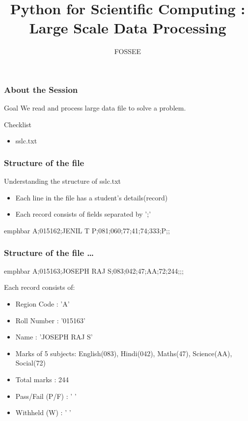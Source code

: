 \documentclass[14pt,compress]{beamer}
\title{Python for Scientific Computing : Large Scale Data Processing}
\author[FOSSEE] {FOSSEE}
\institute[IIT Bombay] {Department of Aerospace Engineering\\IIT Bombay}
\date{}
\newcommand{\emphbar}[1]
{\begin{beamercolorbox}[rounded=true]{emphbar} 
      {#1}
 \end{beamercolorbox}
}
\begin{document}
\begin{frame}
  \maketitle
\end{frame}

\begin{frame}
  \frametitle{About the Session}
  \begin{block}{Goal}
    We read and process large data file to solve a problem.
  \end{block}
  \begin{block}{Checklist}
    \begin{itemize}
    \item sslc.txt
  \end{itemize}
  \end{block}
\end{frame}

\begin{frame}
  \frametitle{Structure of the file}
  Understanding the structure of sslc.txt
  \begin{itemize}
    \item Each line in the file has a student's details(record)
    \item Each record consists of fields separated by ';'
  \end{itemize}
\emphbar{A;015162;JENIL T P;081;060;77;41;74;333;P;;}
\end{frame}

\begin{frame}
  \frametitle{Structure of the file \ldots}
\emphbar{A;015163;JOSEPH RAJ S;083;042;47;AA;72;244;;;}
  Each record consists of:
  \begin{itemize}
    \item Region Code : 'A'
    \item Roll Number : '015163'
    \item Name : 'JOSEPH RAJ S'
    \item Marks of 5 subjects: English(083), Hindi(042), Maths(47), Science(AA), Social(72)
    \item Total marks : 244
    \item Pass/Fail (P/F) : ' '
    \item Withheld (W) : ' '
  \end{itemize}
\end{frame}

\end{document}
